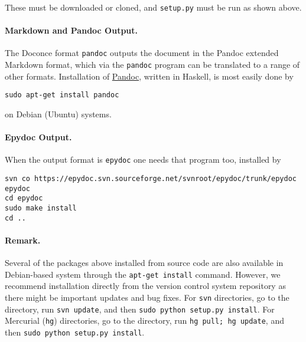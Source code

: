 \documentclass[%
oneside,                 %
final,                   %
10pt]{article}
\begin{document}
\noindent
These must be downloaded or cloned, and {\fontsize{10pt}{10pt}\Verb!setup.py!} must be run as shown
above.

\paragraph{Markdown and Pandoc Output.}
The Doconce format {\fontsize{10pt}{10pt}\Verb!pandoc!} outputs the document in the Pandoc
extended Markdown format, which via the {\fontsize{10pt}{10pt}\Verb!pandoc!} program can be
translated to a range of other formats. Installation of \href{{http://johnmacfarlane.net/pandoc/}}{Pandoc}, written in Haskell, is most
easily done by

\vspace{4pt}
\begin{Verbatim}[numbers=none,frame=lines,fontsize=\fontsize{9pt}{9pt},labelposition=topline,framesep=2.5mm,framerule=0.7pt]
sudo apt-get install pandoc
\end{Verbatim}
on Debian (Ubuntu) systems.

\paragraph{Epydoc Output.}
When the output format is {\fontsize{10pt}{10pt}\Verb!epydoc!} one needs that program too, installed
by
\vspace{4pt}
\begin{Verbatim}[numbers=none,frame=lines,fontsize=\fontsize{9pt}{9pt},labelposition=topline,framesep=2.5mm,framerule=0.7pt]
svn co https://epydoc.svn.sourceforge.net/svnroot/epydoc/trunk/epydoc epydoc
cd epydoc
sudo make install
cd ..
\end{Verbatim}

\paragraph{Remark.}
Several of the packages above installed from source code
are also available in Debian-based system through the
{\fontsize{10pt}{10pt}\Verb!apt-get install!} command. However, we recommend installation directly
from the version control system repository as there might be important
updates and bug fixes. For {\fontsize{10pt}{10pt}\Verb!svn!} directories, go to the directory,
run {\fontsize{10pt}{10pt}\Verb!svn update!}, and then {\fontsize{10pt}{10pt}\Verb!sudo python setup.py install!}. For
Mercurial ({\fontsize{10pt}{10pt}\Verb!hg!}) directories, go to the directory, run
{\fontsize{10pt}{10pt}\Verb!hg pull; hg update!}, and then {\fontsize{10pt}{10pt}\Verb!sudo python setup.py install!}.
\end{document}

